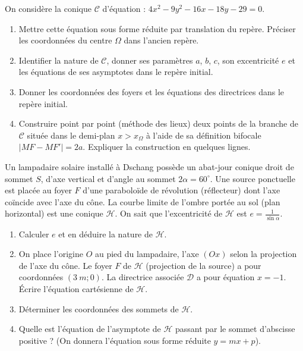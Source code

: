 \documentclass[11pt]{article}
\begin{document}
\begin{exercice}
On considère la conique $\mathcal{C}$ d'équation : $4x^2 - 9y^2 - 16x - 18y - 29 = 0$.
\begin{enumerate}
    \item Mettre cette équation sous forme réduite par translation du repère. Préciser les coordonnées du centre $\Omega$ dans l'ancien repère.
    \item Identifier la nature de $\mathcal{C}$, donner ses paramètres $a$, $b$, $c$, son excentricité $e$ et les équations de ses asymptotes dans le repère initial.
    \item Donner les coordonnées des foyers et les équations des directrices dans le repère initial.
    \item Construire point par point (méthode des lieux) deux points de la branche de $\mathcal{C}$ située dans le demi-plan $x > x_\Omega$ à l'aide de sa définition bifocale $|MF - MF'| = 2a$. Expliquer la construction en quelques lignes.
\end{enumerate}
\end{exercice}

\begin{exercice}
Un lampadaire solaire installé à Dschang possède un abat-jour conique droit de sommet $S$, d'axe vertical et d'angle au sommet $2\alpha = 60^\circ$. Une source ponctuelle est placée au foyer $F$ d'une paraboloïde de révolution (réflecteur) dont l'axe coïncide avec l'axe du cône. La courbe limite de l'ombre portée au sol (plan horizontal) est une conique $\mathcal{H}$.
On sait que l'excentricité de $\mathcal{H}$ est $e = \frac{1}{\sin\alpha}$.
\begin{enumerate}
    \item Calculer $e$ et en déduire la nature de $\mathcal{H}$.
    \item On place l'origine $O$ au pied du lampadaire, l'axe $(Ox)$ selon la projection de l'axe du cône. Le foyer $F$ de $\mathcal{H}$ (projection de la source) a pour coordonnées $(\SI{3}{m}; 0)$. La directrice associée $\mathcal{D}$ a pour équation $x = -1$. Écrire l'équation cartésienne de $\mathcal{H}$.
    \item Déterminer les coordonnées des sommets de $\mathcal{H}$.
    \item Quelle est l'équation de l'asymptote de $\mathcal{H}$ passant par le sommet d'abscisse positive ? (On donnera l'équation sous forme réduite $y = mx + p$).
\end{enumerate}
\end{exercice}
\end{document}
